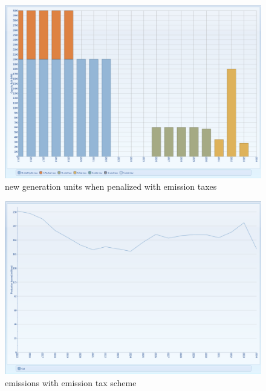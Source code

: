 \documentclass{article}
\begin{document}
\begin{figure}[htbp]
\begin{center}
\includegraphics[width=13cm,keepaspectratio=true]{figures/Expansion/EmissionTax/CapacityBuiltNewGenET}
\caption{new generation units when penalized with emission taxes}
\label{fig:CapacityBuiltNewGenET}
\end{center}
\end{figure}
\begin{figure}[htbp]
\begin{center}
\includegraphics[width=13cm,keepaspectratio=true]{figures/Expansion/EmissionTax/Co2ProductionET}
\caption{emissions with emission tax scheme}
\label{fig:Co2ProductionET}
\end{center}
\end{figure}
\end{document}
